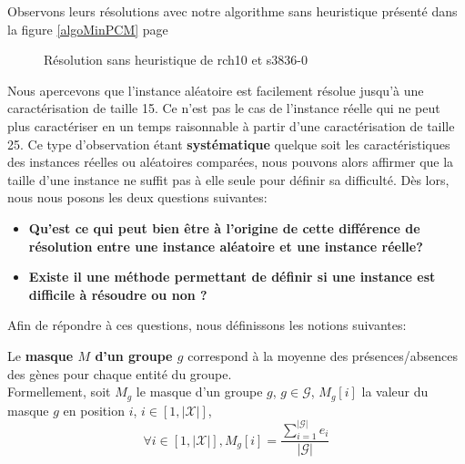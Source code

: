 Observons leurs résolutions avec notre algorithme sans heuristique présenté dans la figure \ref{algoMinPCM} page \pageref{algoMinPCM}
\begin{figure}[H]
\centering
	\begin{minipage}[c]{0.49\linewidth}
	\centering
	
	\end{minipage}
	\begin{minipage}[c]{0.49\linewidth}
	\centering
	
	\end{minipage}
\caption{Résolution sans heuristique de rch10 et s3836-0}
\end{figure} 

Nous apercevons que l'instance aléatoire est facilement résolue jusqu'à une caractérisation de taille 15. Ce n'est pas le cas de l'instance réelle qui ne peut plus caractériser en un temps raisonnable à partir d'une caractérisation de taille 25. Ce type d'observation étant \textbf{systématique} quelque soit les caractéristiques des instances réelles ou aléatoires comparées, nous pouvons alors affirmer que la taille d'une instance ne suffit pas à elle seule pour définir sa difficulté. Dès lors, nous nous posons les deux questions suivantes:\\

\begin{itemize}
\item \textbf{Qu'est ce qui peut bien être à l'origine de cette différence de résolution entre une instance aléatoire et une instance réelle?}
\item \textbf{Existe il une méthode permettant de définir si une instance est difficile à résoudre ou non ?}\\
\end{itemize}
Afin de répondre à ces questions, nous définissons les notions suivantes:

\begin{definition}
Le \textbf{masque $M$ d'un groupe $g$} correspond à la moyenne des présences/absences des gènes pour chaque entité du groupe.\\
Formellement, soit $M_g$ le masque d'un groupe $g$, $g \in \mathcal{G}$, $M_g[i]$ la valeur du masque $g$ en position $i$, $i \in [1,|\mathcal{X}|]$,
$$\forall i \in  [1, |\mathcal{X}|], M_g[i]= \frac{\sum_{i=1}^{|\mathcal{G}|}e_i}{|\mathcal{G}|} $$
\end{definition}

